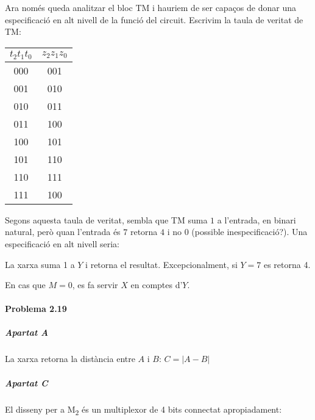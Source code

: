 Ara només queda analitzar el bloc \textsf{TM} i hauriem de ser capaços de donar una especificació en alt nivell de la funció del circuit. Escrivim la taula de veritat de \textsf{TM}:

\begin{center} \begin{tabular}{cc}
$t_2t_1t_0$ & $z_2z_1z_0$ \\
\hline
000 & 001 \\
001 & 010 \\
010 & 011 \\
011 & 100 \\
100 & 101 \\
101 & 110 \\
110 & 111 \\
111 & 100
\end{tabular} \end{center}

Segons aquesta taula de veritat, sembla que \textsf{TM} suma $1$ a l'entrada, en binari natural, però quan l'entrada és $7$ retorna $4$ i no $0$ (possible inespecificació?). Una especificació en alt nivell seria:

\begin{displayquote}
La xarxa suma 1 a $Y$ i retorna el resultat. Excepcionalment, si $Y=7$ es retorna 4.

En cas que $M=0$, es fa servir $X$ en comptes d'$Y$.
\end{displayquote}

\finishpage


\page
\paragraph{Problema 2.19} \hspace{0em}

\subparagraph{Apartat A}

La xarxa retorna la distància entre $A$ i $B$: $C = \left|A - B\right|$

\subparagraph{Apartat C} El disseny per a \textsf{M\textsubscript{2}} és un multiplexor de 4 bits connectat apropiadament:

\begin{center}  \end{center}

